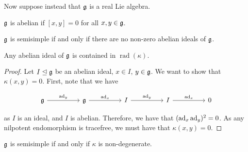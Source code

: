 \documentclass{article}
\DeclareMathOperator{\rad}{rad}
\begin{document}
Now suppose instead that \(\mathfrak{g}\) is a real Lie algebra.

\begin{definition}
    [abelian] \(\mathfrak{g}\) is abelian if \([x, y] = 0\) for all \(x, y \in \mathfrak{g}\).
\end{definition}

\begin{lemma}
    \(\mathfrak{g}\) is semisimple if and only if there are no non-zero abelian ideals of \(\mathfrak{g}\).
\end{lemma}

\begin{lemma}
    Any abelian ideal of \(\mathfrak{g}\) is contained in \(\rad(\kappa)\).
\end{lemma}

\begin{proof}
    Let \(I \trianglelefteq \mathfrak{g}\) be an abelian ideal, \(x \in I\), \(y \in \mathfrak{g}\). We want to show that \(\kappa(x, y) = 0\). First, note that we have

\[\begin{tikzcd}
	\mfg && \mfg && I && I && 0
	\arrow["{\ad_y}", from=1-1, to=1-3]
	\arrow["{\ad_x}", from=1-3, to=1-5]
	\arrow["{\ad_y}", from=1-5, to=1-7]
	\arrow["{\ad_x}", from=1-7, to=1-9]
\end{tikzcd}\]

    as \(I\) is an ideal, and \(I\) is abelian. Therefore, we have that \((\operatorname{ad}_x\operatorname{ad}_y)^2 = 0\). As any nilpotent endomorphism is tracefree, we must have that \(\kappa(x, y) = 0\).
\end{proof}

\begin{theorem}
    \(\mathfrak{g}\) is semisimple if and only if \(\kappa\) is non-degenerate.
\end{theorem}
\end{document}
